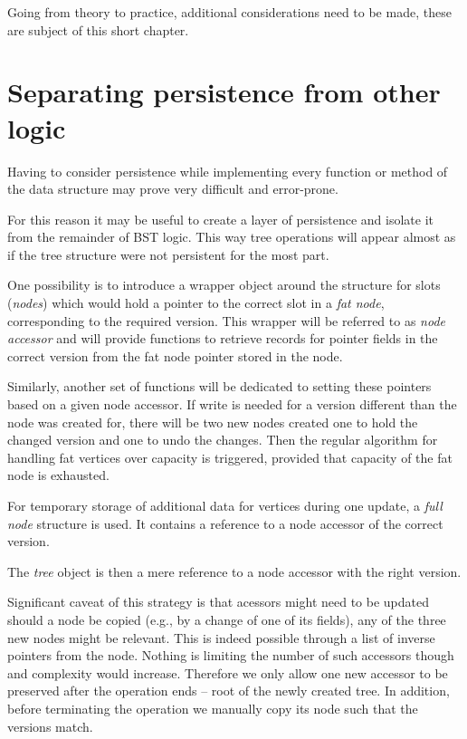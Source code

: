 Going from theory to practice, additional considerations need to be made, these are subject of this short chapter.

\section{Separating persistence from other logic}

Having to consider persistence while implementing every function or method of the data structure may prove very difficult and error-prone.

For this reason it may be useful to create a layer of persistence and isolate it from the remainder of BST logic. 
This way tree operations will appear almost as if the tree structure were not persistent for the most part.

One possibility is to introduce a wrapper object around the structure for slots (\emph{nodes}) which would hold a pointer to the correct slot in a \emph{fat node}, corresponding to the required version. 
This wrapper will be referred to as \emph{node accessor} and will provide functions to retrieve records for pointer fields in the correct version from the fat node pointer stored in the node. 

Similarly, another set of functions will be dedicated to setting these pointers based on a given node accessor. 
If write is needed for a version different than the node was created for, there will be two new nodes created one to hold the changed version and one to undo the changes. 
Then the regular algorithm for handling fat vertices over capacity is triggered, provided that capacity of the fat node is exhausted.

For temporary storage of additional data for vertices during one update, a \emph{full node} structure is used. It contains a reference to a node accessor of the correct version.

The \emph{tree} object is then a mere reference to a node accessor with the right version.

Significant caveat of this strategy is that acessors might need to be updated should a node be copied (e.g., by a change of one of its fields), any of the three new nodes might be relevant. 
This is indeed possible through a list of inverse pointers from the node. Nothing is limiting the number of such accessors though and complexity would increase. 
Therefore we only allow one new accessor to be preserved after the operation ends -- root of the newly created tree. 
In addition, before terminating the operation we manually copy its node such that the versions match.

